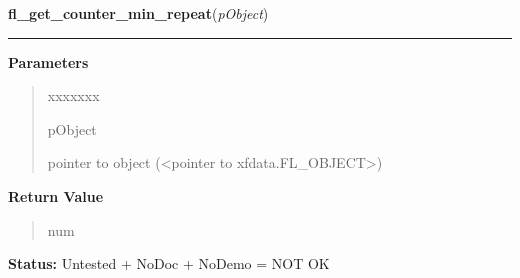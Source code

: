 \hspace{.8\funcindent}\begin{boxedminipage}{\funcwidth}

    \raggedright \textbf{fl\_get\_counter\_min\_repeat}(\textit{pObject})

    \vspace{-1.5ex}

    \rule{\textwidth}{0.5\fboxrule}
\setlength{\parskip}{2ex}
\setlength{\parskip}{1ex}
      \textbf{Parameters}
      \vspace{-1ex}

      \begin{quote}
        \begin{Ventry}{xxxxxxx}

          \item[pObject]

          pointer to object ({\textless}pointer to 
          xfdata.FL\_OBJECT{\textgreater})

        \end{Ventry}

      \end{quote}

      \textbf{Return Value}
    \vspace{-1ex}

      \begin{quote}
      num

      \end{quote}

\textbf{Status:} Untested + NoDoc + NoDemo = NOT OK



    \end{boxedminipage}

    \label{xformslib:library:fl_set_counter_min_repeat}

    \vspace{0.5ex}

